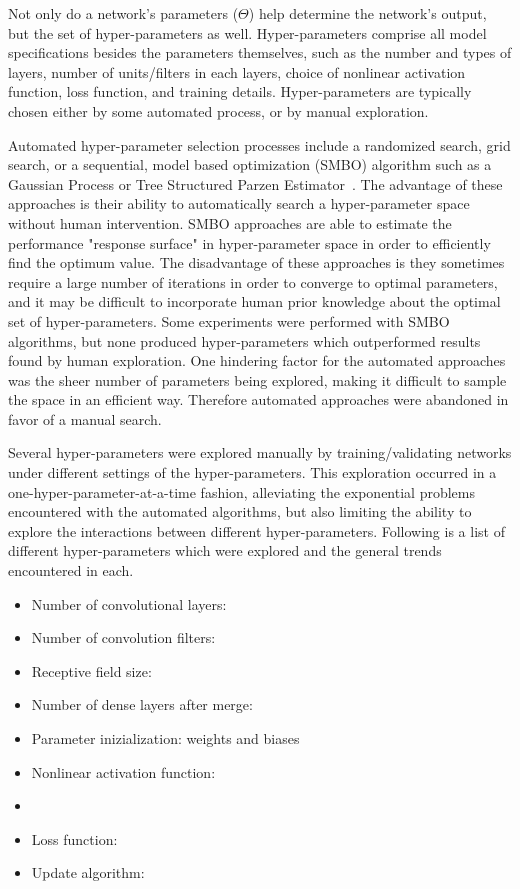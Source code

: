 Not only do a network's parameters ($\Theta$) help determine the network's output, but the set of hyper-parameters as well.
Hyper-parameters comprise all model specifications besides the parameters themselves, such as the number and types of layers, number of units/filters in each layers, choice of nonlinear activation function, loss function, and training details.
Hyper-parameters are typically chosen either by some automated process, or by manual exploration.

Automated hyper-parameter selection processes include a randomized search, grid search, or a sequential, model based optimization (SMBO) algorithm such as a Gaussian Process or Tree Structured Parzen Estimator~\cite{bergstra2011}.
The advantage of these approaches is their ability to automatically search a hyper-parameter space without human intervention. 
SMBO approaches are able to estimate the performance "response surface" in hyper-parameter space in order to efficiently find the optimum value.
The disadvantage of these approaches is they sometimes require a large number of iterations in order to converge to optimal parameters, and it may be difficult to incorporate human prior knowledge about the optimal set of hyper-parameters.
Some experiments were performed with SMBO algorithms, but none produced hyper-parameters which outperformed results found by human exploration.
One hindering factor for the automated approaches was the sheer number of parameters being explored, making it difficult to sample the space in an efficient way.
Therefore automated approaches were abandoned in favor of a manual search.

Several hyper-parameters were explored manually by training/validating networks under different settings of the hyper-parameters.
This exploration occurred in a one-hyper-parameter-at-a-time fashion, alleviating the exponential problems encountered with the automated algorithms, but also limiting the ability to explore the interactions between different hyper-parameters.
Following is a list of different hyper-parameters which were explored and the general trends encountered in each.
\begin{itemize}
	\item Number of convolutional layers:
	\item Number of convolution filters:
	\item Receptive field size:
	\item Number of dense layers after merge:
	\item Parameter inizialization: weights and biases
	\item Nonlinear activation function:
	\item 
	\item Loss function:
	\item Update algorithm:
\end{itemize}

